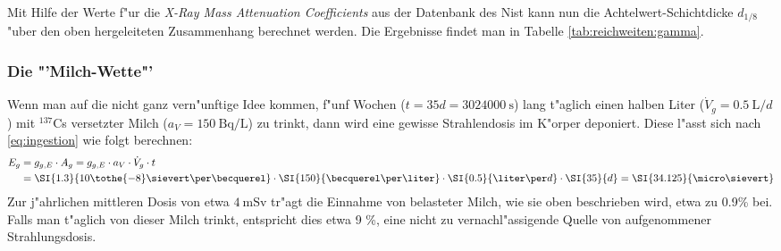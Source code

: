 \documentclass[12pt]{article}
\begin{document}
Mit Hilfe der Werte f"ur die \textit{X-Ray Mass Attenuation Coefficients} aus der Datenbank des Nist \cite{NIST} kann nun die Achtelwert-Schichtdicke $d_{1/8}$ "uber den oben hergeleiteten Zusammenhang berechnet werden. Die Ergebnisse findet man in Tabelle \ref{tab:reichweiten:gamma}.
\begin{table}[h!]
	\centering
	\caption{Reichweite von $\gamma$-Strahlung mit $E_{kin}=\SI{1.5}{\mega\electronvolt}$ in Materie. *F"ur Luft wurde die Dichte auf H"ohe des Meeresspiegels und f"ur $\SI{20}{\degreeCelsius}$ angegeben. **F"ur Normalbeton wurde eine Dichte zwischen $\SI{2.0}{\gram\per\centi\meter\squared}$ und $\SI{2.6}{\gram\per\centi\meter\squared}$ abgesch"atzt.}
	\label{tab:reichweiten:gamma}%
\end{table}%

\subsubsection{Die "'Milch-Wette"'}
Wenn man auf die nicht ganz vern"unftige Idee kommen, f"unf Wochen ($t=35d=\SI{3024000}{\second}$) lang t"aglich einen halben Liter ($\dot{V}_g=\SI{0.5}{\liter\per d}$) mit $^{137}$Cs versetzter Milch ($a_{V}=\SI{150}{\becquerel\per\liter}$) zu trinkt, dann wird eine gewisse Strahlendosis im K"orper deponiert. Diese l"asst sich nach \eqref{eq:ingestion} wie folgt berechnen:
\begin{align*}
E_g&=g_{g,E}\cdot A_g=g_{g,E}\cdot a_V\cdot \dot{V}_g \cdot t\\
&=\SI{1.3}{10\tothe{-8}\sievert\per\becquerel}\cdot\SI{150}{\becquerel\per\liter}\cdot\SI{0.5}{\liter\per d}\cdot\SI{35}{d}=\SI{34.125}{\micro\sievert}
\end{align*} 
Zur j"ahrlichen mittleren Dosis von etwa $\SI{4}{\milli\sievert}$ tr"agt die Einnahme von belasteter Milch, wie sie oben beschrieben wird, etwa zu 0.9\% bei. Falls man t"aglich von dieser Milch trinkt, entspricht dies etwa 9 \%, eine nicht zu vernachl"assigende Quelle von aufgenommener Strahlungsdosis. 
\end{document}
